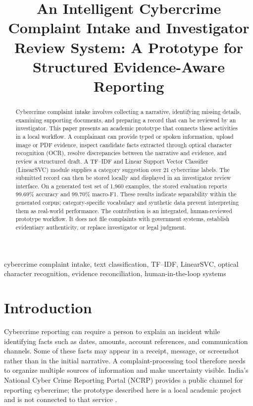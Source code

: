 \documentclass[conference]{IEEEtran}
\title{An Intelligent Cybercrime Complaint Intake and Investigator Review System: A Prototype for Structured Evidence-Aware Reporting}
\author{\IEEEauthorblockN{Pranit Chavan, Harshal Dahiphalkar, Yash Kanhe, and Chaitanya Mali}\IEEEauthorblockA{Department of Computer Engineering\\K. K. Wagh Institute of Engineering Education \& Research, Nashik, India}}
\begin{document}
\maketitle

\begin{abstract}
Cybercrime complaint intake involves collecting a narrative, identifying missing details, examining supporting documents, and preparing a record that can be reviewed by an investigator. This paper presents an academic prototype that connects these activities in a local workflow. A complainant can provide typed or spoken information, upload image or PDF evidence, inspect candidate facts extracted through optical character recognition (OCR), resolve discrepancies between the narrative and evidence, and review a structured draft. A TF--IDF and Linear Support Vector Classifier (LinearSVC) module supplies a category suggestion over 21 cybercrime labels. The submitted record can then be stored locally and displayed in an investigator review interface. On a generated test set of 1,960 examples, the stored evaluation reports 99.69\% accuracy and 99.70\% macro-F1. These results indicate separability within the generated corpus; category-specific vocabulary and synthetic data prevent interpreting them as real-world performance. The contribution is an integrated, human-reviewed prototype workflow. It does not file complaints with government systems, establish evidentiary authenticity, or replace investigator or legal judgment.
\end{abstract}

\begin{IEEEkeywords}
cybercrime complaint intake, text classification, TF--IDF, LinearSVC, optical character recognition, evidence reconciliation, human-in-the-loop systems
\end{IEEEkeywords}

\section{Introduction}
Cybercrime reporting can require a person to explain an incident while identifying facts such as dates, amounts, account references, and communication channels. Some of these facts may appear in a receipt, message, or screenshot rather than in the initial narrative. A complaint-processing tool therefore needs to organize multiple sources of information and make uncertainty visible. India's National Cyber Crime Reporting Portal (NCRP) provides a public channel for reporting cybercrime; the prototype described here is a local academic project and is not connected to that service \cite{mhaNcrp}.
\end{document}

